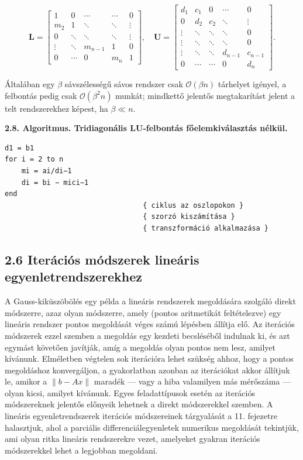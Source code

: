 \documentclass[
  magyar,
  11pt]{article}
\providecommand{\boldsymbol}[1]{\mathbf{#1}}
\begin{document}
\[\boldsymbol{L} = \begin{bmatrix} 1 & 0 & \cdots & \cdots & 0 \\ m_2 & 1 & \ddots & \ddots & \vdots \\ 0 & \ddots & \ddots & \ddots & \vdots \\ \vdots & \ddots & m_{n-1} & 1 & 0 \\ 0 & \cdots & 0 & m_n & 1 \end{bmatrix}, \quad \boldsymbol{U} = \begin{bmatrix} d_1 & c_1 & 0 & \cdots & 0 \\ 0 & d_2 & c_2 & \ddots & \vdots \\ \vdots & \ddots & \ddots & \ddots & 0 \\ \vdots & \ddots & \ddots & \ddots & 0 \\ \vdots & \ddots & \ddots & d_{n-1} & c_{n-1} \\ 0 & \cdots & \cdots & 0 & d_n \end{bmatrix}.\]

Általában egy \(\beta\) sávszélességű sávos rendszer csak
\(\mathcal{O}(\beta n)\) tárhelyet igényel, a felbontás pedig csak
\(\mathcal{O}(\beta^2 n)\) munkát; mindkettő jelentős megtakarítást
jelent a telt rendszerekhez képest, ha \(\beta \ll n\).

\textbf{2.8. Algoritmus. Tridiagonális LU-felbontás főelemkiválasztás
nélkül.}

\begin{verbatim}
d1 = b1
for i = 2 to n
    mi = ai/di−1
    di = bi − mici−1
end
                                 { ciklus az oszlopokon }
                                 { szorzó kiszámítása }
                                 { transzformáció alkalmazása }
\end{verbatim}

\subsection{2.6 Iterációs módszerek lineáris
egyenletrendszerekhez}\label{iteruxe1ciuxf3s-muxf3dszerek-lineuxe1ris-egyenletrendszerekhez}

A Gauss-kiküszöbölés egy példa a lineáris rendszerek megoldására
szolgáló direkt módszerre, azaz olyan módszerre, amely (pontos
aritmetikát feltételezve) egy lineáris rendszer pontos megoldását véges
számú lépésben állítja elő. Az iterációs módszerek ezzel szemben a
megoldás egy kezdeti becsléséből indulnak ki, és azt egymást követően
javítják, amíg a megoldás olyan pontos nem lesz, amilyet kívánunk.
Elméletben végtelen sok iterációra lehet szükség ahhoz, hogy a pontos
megoldáshoz konvergáljon, a gyakorlatban azonban az iterációkat akkor
állítjuk le, amikor a \(\|b - Ax\|\) maradék --- vagy a hiba valamilyen
más mérőszáma --- olyan kicsi, amilyet kívánunk. Egyes feladattípusok
esetén az iterációs módszereknek jelentős előnyeik lehetnek a direkt
módszerekkel szemben. A lineáris egyenletrendszerek iterációs
módszereinek tárgyalását a 11. fejezetre halasztjuk, ahol a parciális
differenciálegyenletek numerikus megoldását tekintjük, ami olyan ritka
lineáris rendszerekre vezet, amelyeket gyakran iterációs módszerekkel
lehet a legjobban megoldani.
\end{document}
